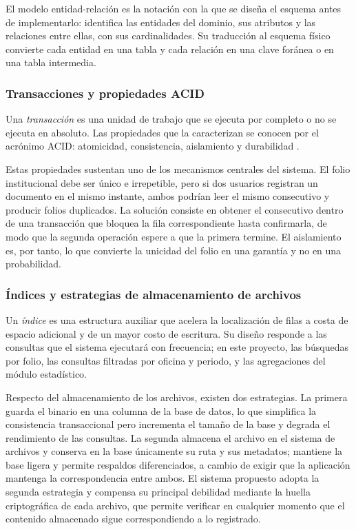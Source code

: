 El modelo entidad-re\-la\-ción es la notación con la que se diseña el esquema antes de implementarlo: identifica las entidades del dominio, sus atributos y las relaciones entre ellas, con sus cardinalidades. Su traducción al esquema físico convierte cada entidad en una tabla y cada relación en una clave foránea o en una tabla intermedia.

\subsubsection{Transacciones y propiedades ACID}

Una \emph{transacción} es una unidad de trabajo que se ejecuta por completo o no se ejecuta en absoluto. Las propiedades que la caracterizan se conocen por el acrónimo ACID: atomicidad, consistencia, aislamiento y durabilidad \cite{elmasri2016}.

Estas propiedades sustentan uno de los mecanismos centrales del sistema. El folio institucional debe ser único e irrepetible, pero si dos usuarios registran un documento en el mismo instante, ambos podrían leer el mismo consecutivo y producir folios duplicados. La solución consiste en obtener el consecutivo dentro de una transacción que bloquea la fila correspondiente hasta confirmarla, de modo que la segunda operación espere a que la primera termine. El aislamiento es, por tanto, lo que convierte la unicidad del folio en una garantía y no en una probabilidad.

\subsubsection{Índices y estrategias de almacenamiento de archivos}

Un \emph{índice} es una estructura auxiliar que acelera la localización de filas a costa de espacio adicional y de un mayor costo de escritura. Su diseño responde a las consultas que el sistema ejecutará con frecuencia; en este proyecto, las búsquedas por folio, las consultas filtradas por oficina y periodo, y las agregaciones del módulo estadístico.

Respecto del almacenamiento de los archivos, existen dos estrategias. La primera guarda el binario en una columna de la base de datos, lo que simplifica la consistencia transaccional pero incrementa el tamaño de la base y degrada el rendimiento de las consultas. La segunda almacena el archivo en el sistema de archivos y conserva en la base únicamente su ruta y sus metadatos; mantiene la base ligera y permite respaldos diferenciados, a cambio de exigir que la aplicación mantenga la correspondencia entre ambos. El sistema propuesto adopta la segunda estrategia y compensa su principal debilidad mediante la huella criptográfica de cada archivo, que permite verificar en cualquier momento que el contenido almacenado sigue correspondiendo a lo registrado.

